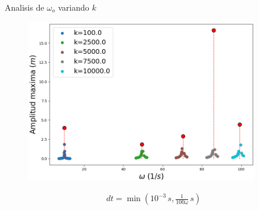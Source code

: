 \begin{frame}{Analisis de $\omega_o$ variando $k$}
    \begin{minipage}[c]{0.7\linewidth}
        \begin{figure}[H]
            \centering
            \includegraphics[width=0.9\textwidth]{pic/05-results/amp_w_k}
            \label{fig:amp_w_k}
        \end{figure}
    \end{minipage}
    \begin{minipage}[c]{0.25\linewidth}
        \large{
            \begin{equation*}
                \begin{aligned}
                    dt = \min\left(10^{-3}\,s, \frac{1}{100 \omega}\,s\right)
                \end{aligned}
            \end{equation*}
        }
    \end{minipage}
\end{frame}

